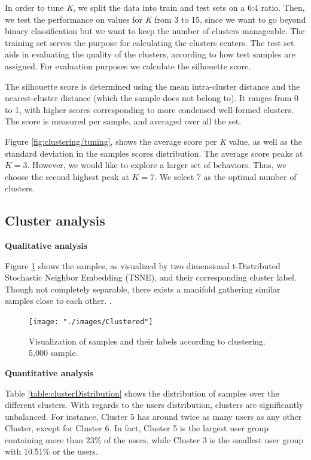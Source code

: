 \documentclass{article}
\begin{document}
In order to tune \textit{K}, we split the data into train and test sets on a 6:4 ratio. Then, we test the performance on values for \textit{K} from 3 to 15, since we want to go beyond binary classification but we want to keep the number of clusters manageable. The training set serves the purpose for calculating the clusters centers. The test set aids in evaluating the quality of the clusters, according to how test samples are assigned. For evaluation purposes we calculate the silhouette score. 

The silhouette score is determined using the mean intra-cluster distance and the nearest-cluster distance (which the sample does not belong to). It ranges from 0 to 1, with higher scores corresponding to more condensed well-formed clusters. The score is measured per sample, and averaged over all the set. 

Figure \ref{fig:clustering/tuning}, shows the average score per \textit{K} value, as well as the standard deviation in the samples scores distribution. The average score peaks at $\textit{K} = 3 $. However, we would like to explore a larger set of behaviors. Thus, we choose the second highest peak at $\textit{K} = 7 $. We select 7 as the optimal number of clusters. 

\subsection{Cluster analysis}

\textbf{Qualitative analysis}


Figure \ref{fig:clustering/tsne} shows the samples, as visualized by two dimensional t-Distributed Stochastic Neighbor Embedding (TSNE), and their corresponding cluster label. Though not completely separable, there exists a manifold gathering similar samples close to each other. . 

\begin{figure}[H]
  \centering
  \texttt{[image: "./images/Clustered"]}
  \caption{Visualization of samples and their labels according to clustering. 5,000 sample.}
  \label{fig:clustering/tsne}
\end{figure}

\textbf{Quantitative analysis}

Table \ref{table:clusterDistribution} shows the distribution of samples over the different clusters. With regards to the users distribution, clusters are significantly unbalanced. For instance, Cluster 5 has around twice as many users as any other Cluster, except for Cluster 6. In fact, Cluster 5 is the largest user group containing more than 23\% of the users, while Cluster 3 is the smallest user group with 10.51\% or the users.
\end{document}

